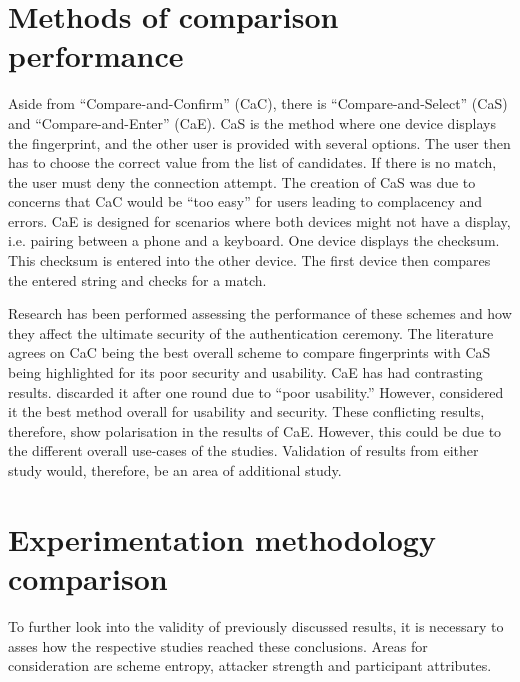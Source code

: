 \section*{Methods of comparison performance}
Aside 
from ``Compare-and-Confirm'' (CaC), there is ``Compare-and-Select'' (CaS) and ``Compare-and-Enter'' (CaE). CaS is the method where one device displays the fingerprint, and the other user is provided with several options. The user then has to choose the correct value from the list of candidates. If there is no match, the user must deny the connection attempt. The creation of CaS was due to concerns that CaC would be ``too easy'' for users leading to complacency and errors\cite{uzun2007usability}. CaE is designed for scenarios where both devices might not have a display, i.e. pairing between a phone and a keyboard. One device displays the checksum. This checksum is entered into the other device. The first device then compares the entered string and checks for a match.

Research has been performed assessing the performance of these schemes and how they affect the ultimate security of the authentication ceremony. The literature agrees on CaC being the best overall scheme to compare fingerprints \cite{tan2017can}\cite{uzun2007usability} with CaS being highlighted for its poor security and usability. CaE has  had contrasting results. \cite{uzun2007usability} discarded it after one round due to ``poor usability.'' However, \cite{tan2017can} considered it the best method overall for usability and security. These conflicting results, therefore, show polarisation in the results of CaE. However, this could be due to the different overall use-cases of the studies. Validation of results from either study would, therefore, be an area of additional study.


\section*{Experimentation methodology comparison}
To further look into the validity of previously discussed results, it is necessary to asses how the respective studies reached these conclusions. Areas for consideration are scheme entropy, attacker strength and participant attributes.

